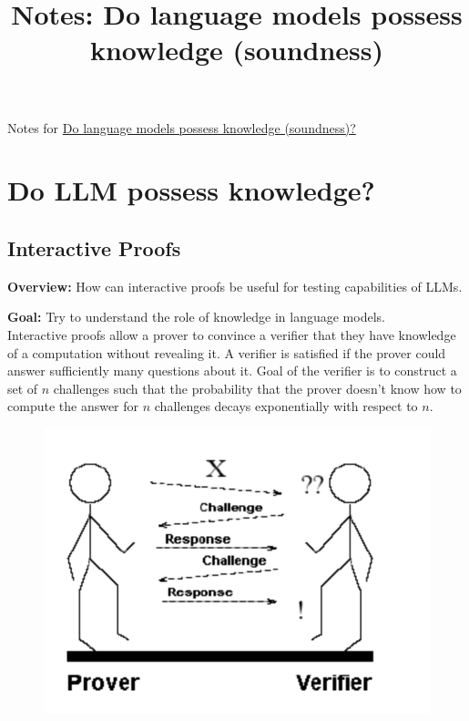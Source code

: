 \documentclass{article}
\begin{document}
\title{Notes: Do language models possess knowledge (soundness)}
\maketitle

Notes for \href{https://hackmd.io/@pinged/zk-and-llms}{Do language models possess knowledge (soundness)?} \\ 

\section{Do LLM possess knowledge?}

\subsection{Interactive Proofs}
\textbf{Overview:} How can interactive proofs be useful for testing capabilities of LLMs. 

\textbf{Goal:} Try to understand the role of knowledge in language models. \\

Interactive proofs allow a prover to convince a verifier that they have knowledge of a computation without revealing it. 
A verifier is satisfied if the prover could answer sufficiently many questions about it. Goal of the verifier is to construct a set of \(n\) challenges such that the probability that the prover doesn't know how to compute the answer for \(n\) challenges decays exponentially with respect to \(n\).

\begin{figure}[!h]
    \centering
    \includegraphics[scale=.5]{Figures/Screen Shot 2023-04-27 at 2.36.17 PM.png}
\end{figure}
\end{document}
